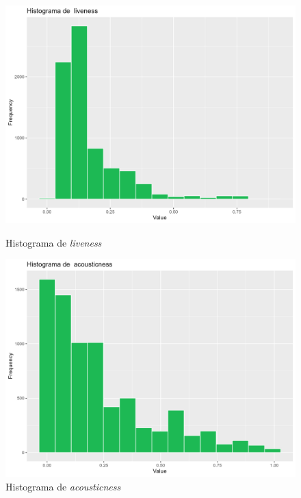 \begin{figure}[H]
\centering
    \begin{minipage}{.4\textwidth}
        \centering
        \includegraphics[width=0.95\linewidth]{Images/2_Univariate/hist_liveness.png}
        \caption{Histograma de \textit{liveness}}
        \label{fig:UnivariateR_liveness}
    \end{minipage}%
    \begin{minipage}{.4\textwidth}
        \centering
        \includegraphics[width=0.95\linewidth]{Images/2_Univariate/hist_acousticness.png}
        \caption{Histograma de \textit{acousticness}}
        \label{fig:UnivariateR_acousticness}
    \end{minipage}%
\end{figure}

